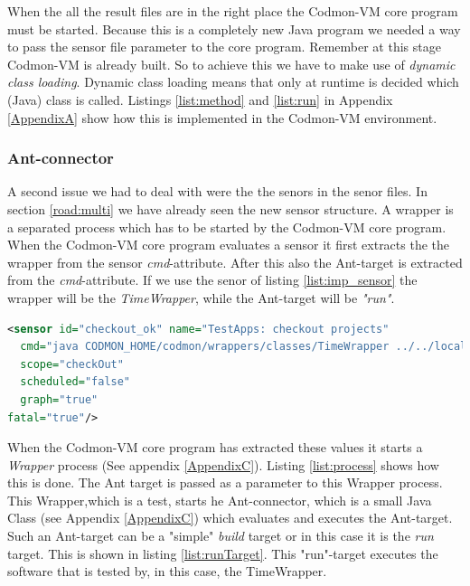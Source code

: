 \documentclass{article}
\newcommand{\project}{Codmon-VM}
\begin{document}
\noindent When the all the result files are in the right place the \project{} core program must be started. Because this is a completely new Java program we needed a way to pass the sensor file parameter to 
the core program. Remember at this stage \project{} is already built. So to achieve this we have to make use of \emph{dynamic class loading}. Dynamic class loading means that only at runtime is decided which 
(Java) class is called. Listings \ref{list:method} and \ref{list:run} in Appendix \ref{AppendixA} show how this is implemented in the \project{} environment.

\subsubsection{Ant-connector}
\label{imp:ant}
A second issue we had to deal with were the the senors in the senor files. In section \ref{road:multi} we have already seen the new sensor structure. A wrapper is a separated process which has to be started by 
the \project{} core program.  When the \project{} core program evaluates a sensor it first extracts the the wrapper from the sensor \emph{cmd}-attribute. After this also the Ant-target is extracted from the 
\emph{cmd}-attribute. If we use the senor of listing \ref{list:imp_sensor} the wrapper will be the \emph{TimeWrapper}, while the Ant-target will be \emph{"run"}.\\

\begin{lstlisting}[frame=shadowbox, language=XML,showstringspaces=false]
<sensor id="checkout_ok" name="TestApps: checkout projects" 
  cmd="java CODMON_HOME/codmon/wrappers/classes/TimeWrapper ../../local/checkoutApplications ant run"  
  scope="checkOut" 
  scheduled="false" 
  graph="true" 
fatal="true"/>
\end{lstlisting} 

\noindent When the \project{} core program has extracted these values it starts a \emph{Wrapper} process (See appendix \ref{AppendixC}). Listing \ref{list:process} shows how this is done. The Ant target is 
passed as a parameter to this Wrapper process. This Wrapper,which is a test, starts he Ant-connector, which is a small Java Class (see Appendix \ref{AppendixC}) which evaluates and executes the Ant-target. 
Such an Ant-target can be a "simple" \emph{build} target or in this case it is the \emph{run} target. This is shown in listing \ref{list:runTarget}. This "run"-target executes the software that is tested by, 
in this case, the TimeWrapper.\\
 
\end{document}
